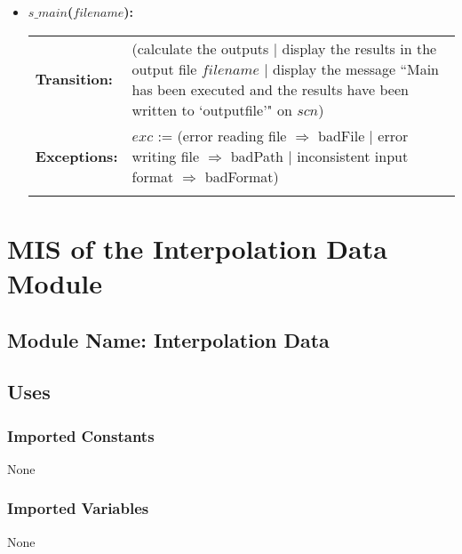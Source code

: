 \documentclass[12pt]{article}
\begin{document}
\begin{itemize}
\item\textbf{$s\_main$($filename$):} \\ \newline
\begin{tabular}{l p{}} 
\textbf{Transition:} & 
(calculate the outputs  \newline $|$ display the results in the output file $filename$ \newline 
$|$ display the message ``Main has been executed and the results have been written to 
`outputfile'" on $scn$) \\
\textbf{Exceptions:} & $exc$ := \newline
(error reading file $\Rightarrow$ badFile \newline $|$ error writing file $\Rightarrow$ badPath 
\newline $|$ inconsistent input format $\Rightarrow$ badFormat)\\ \\
\end{tabular}
\end{itemize}


\section{MIS of the Interpolation Data Module} \label{SecInterpD}

\subsection{Module Name: Interpolation Data}

\subsection{Uses}

\subsubsection{Imported Constants}

None

\subsubsection{Imported Variables}

None
\end{document}
